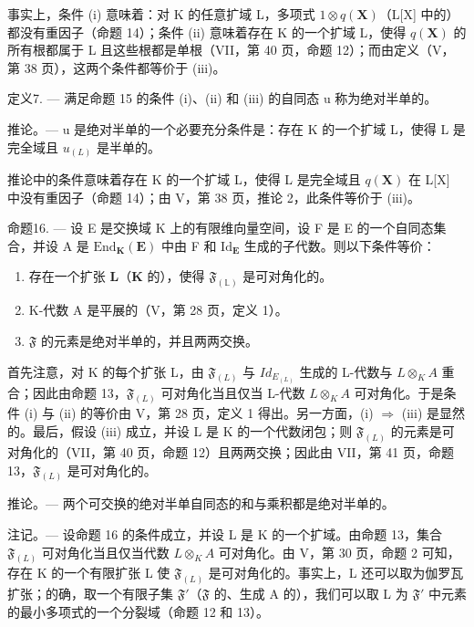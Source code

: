 事实上，条件 (i) 意味着：对 K 的任意扩域 L，多项式 \(1 \otimes q(\mathbf{X})\)（L{[}X{]} 中的）都没有重因子（命题 14）；条件 (ii) 意味着存在 K 的一个扩域 L，使得 \(q(\mathbf{X})\) 的所有根都属于 L 且这些根都是单根（VII，第 40 页，命题 12）；而由定义（V，第 38 页），这两个条件都等价于 (iii)。

定义7. --- 满足命题 15 的条件 (i)、(ii) 和 (iii) 的自同态 u 称为绝对半单的。

推论。--- u 是绝对半单的一个必要充分条件是：存在 K 的一个扩域 L，使得 L 是完全域且 \(u_{(L)}\) 是半单的。

推论中的条件意味着存在 K 的一个扩域 L，使得 L 是完全域且 \(q(\mathbf{X})\) 在 L{[}X{]} 中没有重因子（命题 14）；由 V，第 38 页，推论 2，此条件等价于 (iii)。

命题16. --- 设 E 是交换域 K 上的有限维向量空间，设 F 是 E 的一个自同态集合，并设 A 是 \(\mathrm{End}_{\mathbf{K}}(\mathbf{E})\) 中由 F 和 \(\mathrm{Id}_{\mathbf{E}}\) 生成的子代数。则以下条件等价：

\begin{enumerate}
\def\labelenumi{(\roman{enumi})}
\item
  存在一个扩张 \(\mathbf{L}\)（\(\mathbf{K}\) 的），使得 \(\mathfrak{F}_{(\mathbb{L})}\) 是可对角化的。
\item
  K-代数 A 是平展的（V，第 28 页，定义 1）。
\item
  \(\mathfrak{F}\) 的元素是绝对半单的，并且两两交换。
\end{enumerate}

首先注意，对 K 的每个扩张 L，由 \(\mathfrak{F}_{(L)}\) 与 \(Id_{E_{(L)}}\) 生成的 L-代数与 \(L \otimes_{K} A\) 重合；因此由命题 13，\(\mathfrak{F}_{(L)}\) 可对角化当且仅当 L-代数 \(L \otimes_{K} A\) 可对角化。于是条件 (i) 与 (ii) 的等价由 V，第 28 页，定义 1 得出。另一方面，(i) \(\Rightarrow\) (iii) 是显然的。最后，假设 (iii) 成立，并设 L 是 K 的一个代数闭包；则 \(\mathfrak{F}_{(L)}\) 的元素是可对角化的（VII，第 40 页，命题 12）且两两交换；因此由 VII，第 41 页，命题 13，\(\mathfrak{F}_{(L)}\) 是可对角化的。

推论。--- 两个可交换的绝对半单自同态的和与乘积都是绝对半单的。

注记。--- 设命题 16 的条件成立，并设 L 是 K 的一个扩域。由命题 13，集合 \(\mathfrak{F}_{(L)}\) 可对角化当且仅当代数 \(L \otimes_K A\) 可对角化。由 V，第 30 页，命题 2 可知，存在 K 的一个有限扩张 L 使 \(\mathfrak{F}_{(L)}\) 是可对角化的。事实上，L 还可以取为伽罗瓦扩张；的确，取一个有限子集 \(\mathfrak{F}'\)（\(\mathfrak{F}\) 的、生成 A 的），我们可以取 L 为 \(\mathfrak{F}'\) 中元素的最小多项式的一个分裂域（命题 12 和 13）。

